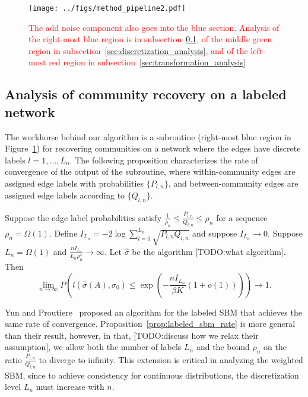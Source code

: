 \documentclass{article}
\begin{document}
\begin{figure}[htp]
\centering
\texttt{[image: ../figs/method\_pipeline2.pdf]}
\caption{\textcolor{red}{The add noise component also goes into the blue section. Analysis of the right-most blue region is in subsection~\ref{sec:labeled_sbm_analysis}, of the middle green region in subsection~\ref{sec:discretization_analysis}, and of the left-most red region in subsection~\ref{sec:transformation_analysis}}}
\label{fig:method_pipeline1}
\end{figure}

\subsection{Analysis of community recovery on a labeled network}
\label{sec:labeled_sbm_analysis}

The workhorse behind our algorithm is a subroutine (right-most blue region in Figure~\ref{fig:method_pipeline1}) for recovering communities on a network where the edges have discrete labels $l=1, \dots, L_n$. The following proposition characterizes the rate of convergence of the output of the subroutine, where within-community edges are assigned edge labels with probabilities $\{P_{l,n}\}$, and between-community edges are assigned edge labels according to $\{Q_{l,n}\}$. 

\begin{proposition}
\label{prop:labeled_sbm_rate}
Suppose the edge label probabilities satisfy $\frac{1}{\rho_n} \leq \frac{P_{l,n}}{Q_{l,n}} \leq \rho_n$ for a sequence $\rho_n = \Omega(1)$. Define $I_{L_n} = -2 \log \sum_{l=0}^{L_n} \sqrt{P_{l,n} Q_{l,n}}$ and suppose $I_{L_n} \rightarrow 0$. Suppose ${L_n} = \Omega(1)$ and $\frac{n I_{L_n}}{{L_n} \rho^4_n} \rightarrow \infty$. Let $\hat{\sigma}$ be the algorithm [TODO:what algorithm]. Then
\[
\lim_{n \rightarrow \infty} P \left( l(\hat{\sigma}(A), \sigma_0) \leq \exp \left( - \frac{ n I_{L_n}}{ \beta K} (1 + o(1)) \right) \right) \rightarrow 1.
\]
\end{proposition}

Yun and Proutiere~\cite{yun2016optimal} proposed an algorithm for the labeled SBM that achieves the same rate of convergence. Proposition~\ref{prop:labeled_sbm_rate} is more general than their result, however, in that, [TODO:discuss how we relax their assumption], we allow both the number of labels ${L_n}$ and the bound $\rho_n$ on the ratio $\frac{P_{l,n}}{Q_{l,n}}$ to diverge to infinity. This extension is critical in analyzing the weighted SBM, since to achieve consistency for continuous distributions, the discretization level $L_n$ must increase with $n$. 
\end{document}
